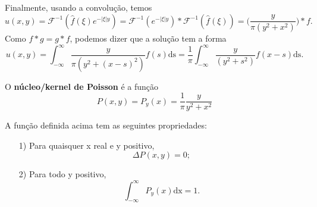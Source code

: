 \documentclass[../pde_notes.tex]{subfiles}
\begin{document}
Finalmente, usando a convolução, temos
\[
	u(x, y) = \mathcal{F}^{-1}(\hat{f}(\xi )e^{-|\xi |y}) = \mathcal{F}^{-1}(e^{-|\xi |y})*\mathcal{F}^{-1}(\hat{f}(\xi )) = \biggl(\frac{y}{\pi (y^{2}+x^{2})}\biggr)*f.
\]
Como \(f*g = g*f\), podemos dizer que a solução tem a forma
\[
	u(x, y) = \int_{-\infty}^{\infty}\frac{y}{\pi (y^{2}+(x-s)^{2})}f(s) \mathrm{ds} = \frac{1}{\pi }\int_{-\infty}^{\infty}\frac{y}{(y^{2}+s^{2})}f(x-s) \mathrm{ds}.
\]
\begin{def*}
	O \textbf{núcleo/kernel de Poisson} é a função
	\[
		P(x, y) = P_y(x) = \frac{1}{\pi }\frac{y}{y^{2}+x^{2}}
	\]
\end{def*}
\begin{prop*}
	A função definida acima tem as seguintes propriedades:
	\begin{itemize}
		\item[1)] Para quaisquer x real e y positivo,
		      \[
			      \Delta P(x, y) =0;
		      \]
		\item[2)] Para todo y positivo,
		      \[
			      \int_{-\infty}^{\infty}P_y(x) \mathrm{dx} = 1.
		      \]
	\end{itemize}
\end{prop*}
\end{document}
